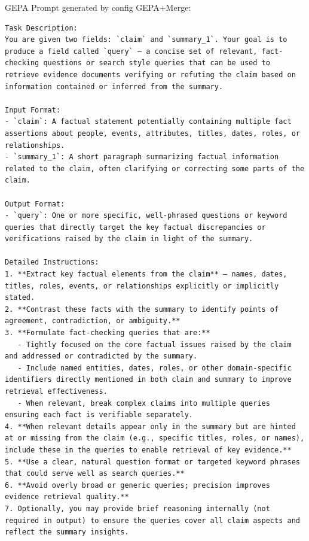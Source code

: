 \begin{instructbox}
\begin{lstlisting}[breakindent=0pt, breaklines=true, breakatwhitespace=true, frame=single, backgroundcolor=\color{green!10}]
\end{lstlisting}

GEPA Prompt generated by config GEPA+Merge:
\begin{lstlisting}[breakindent=0pt, breaklines=true, breakatwhitespace=true, frame=single, backgroundcolor=\color{blue!10}]
Task Description:  
You are given two fields: `claim` and `summary_1`. Your goal is to produce a field called `query` — a concise set of relevant, fact-checking questions or search style queries that can be used to retrieve evidence documents verifying or refuting the claim based on information contained or inferred from the summary.

Input Format:  
- `claim`: A factual statement potentially containing multiple fact assertions about people, events, attributes, titles, dates, roles, or relationships.  
- `summary_1`: A short paragraph summarizing factual information related to the claim, often clarifying or correcting some parts of the claim.

Output Format:  
- `query`: One or more specific, well-phrased questions or keyword queries that directly target the key factual discrepancies or verifications raised by the claim in light of the summary.

Detailed Instructions:  
1. **Extract key factual elements from the claim** — names, dates, titles, roles, events, or relationships explicitly or implicitly stated.  
2. **Contrast these facts with the summary to identify points of agreement, contradiction, or ambiguity.**  
3. **Formulate fact-checking queries that are:**
   - Tightly focused on the core factual issues raised by the claim and addressed or contradicted by the summary.  
   - Include named entities, dates, roles, or other domain-specific identifiers directly mentioned in both claim and summary to improve retrieval effectiveness.  
   - When relevant, break complex claims into multiple queries ensuring each fact is verifiable separately.  
4. **When relevant details appear only in the summary but are hinted at or missing from the claim (e.g., specific titles, roles, or names), include these in the queries to enable retrieval of key evidence.**  
5. **Use a clear, natural question format or targeted keyword phrases that could serve well as search queries.**  
6. **Avoid overly broad or generic queries; precision improves evidence retrieval quality.**  
7. Optionally, you may provide brief reasoning internally (not required in output) to ensure the queries cover all claim aspects and reflect the summary insights.


\end{lstlisting}
\end{instructbox}
